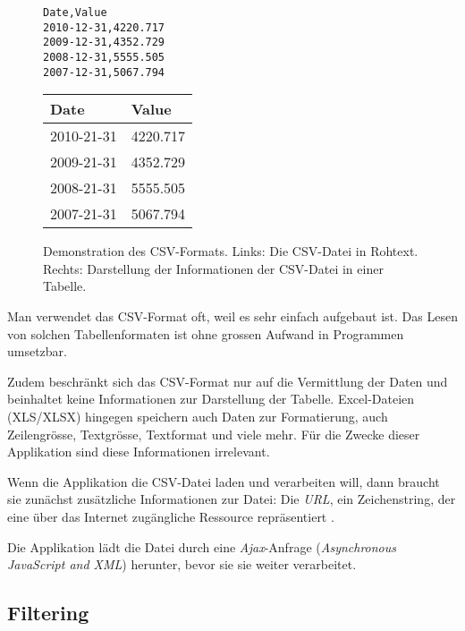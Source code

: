 \begin{figure}[!htbp]
	\centering
	\begin{minipage}{0.5\textwidth}
		\centering
		\begin{verbatim}
Date,Value
2010-12-31,4220.717
2009-12-31,4352.729
2008-12-31,5555.505
2007-12-31,5067.794
		\end{verbatim}
	\end{minipage}\hfill
	\begin{minipage}{0.5\textwidth}
		\centering
		\begin{tabular}{ | l | l |}
			\hline
			\textbf{Date} & \textbf{Value} \\ \hline
			2010-21-31 & 4220.717 \\ \hline
			2009-21-31 & 4352.729 \\ \hline
			2008-21-31 & 5555.505 \\ \hline
			2007-21-31 & 5067.794 \\ \hline
		\end{tabular}
	\end{minipage}
	\caption[Demonstration des CSV-Formats]{Demonstration des CSV-Formats. Links: Die CSV-Datei in Rohtext. Rechts: Darstellung der Informationen der CSV-Datei in einer Tabelle.}
	\label{fig:csv}
\end{figure}

Man verwendet das CSV-Format oft, weil es sehr einfach aufgebaut ist. Das Lesen von solchen Tabellenformaten ist ohne grossen Aufwand in Programmen umsetzbar. 

Zudem beschränkt sich das CSV-Format nur auf die Vermittlung der Daten und beinhaltet keine Informationen zur Darstellung der Tabelle. Excel-Dateien (XLS/XLSX) hingegen speichern auch Daten zur Formatierung, auch Zeilengrösse, Textgrösse, Textformat und viele mehr. Für die Zwecke dieser Applikation sind diese Informationen irrelevant.
 
 
Wenn die Applikation die CSV-Datei laden und verarbeiten will, dann braucht sie zunächst zusätzliche Informationen zur Datei: Die \textit{URL}, ein Zeichenstring, der eine über das Internet zugängliche Ressource repräsentiert \cite{url}.

Die Applikation lädt die Datei durch eine \textit{Ajax}-Anfrage (\textit{Asynchronous JavaScript and XML}) herunter, bevor sie sie weiter verarbeitet.

\subsection{Filtering}

